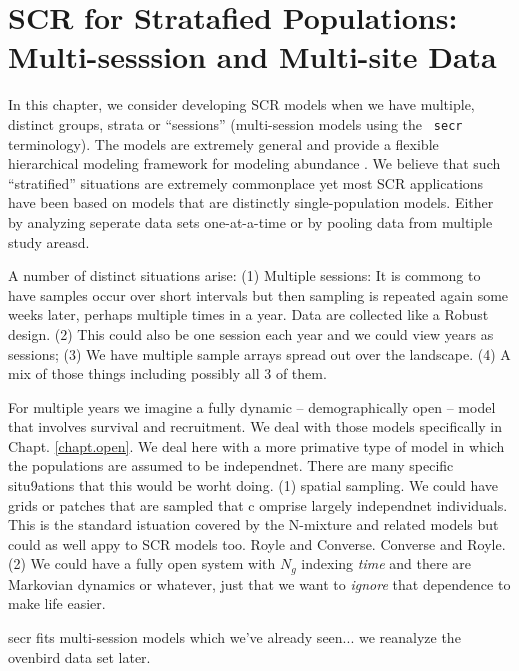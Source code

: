 \chapter{SCR for Stratafied Populations: 
Multi-sesssion and Multi-site Data}
\label{chapt.hscr}

\vspace{0.3cm}


In this chapter, we consider developing SCR models when we have
multiple, distinct groups, strata or ``sessions'' (multi-session
models using the \mbox{\tt
  secr} terminology). The models are extremely general and provide a
flexible hierarchical modeling framework for modeling abundance
\citep{converse_royle:2012, royle_etal:2012arXiv}.
We believe that such ``stratified'' situations are extremely
commonplace yet most SCR applications have been based on models that
are distinctly single-population models. Either by analyzing seperate
data sets one-at-a-time or by pooling data from multiple study areasd.

A number of distinct situations arise:
(1) Multiple sessions:
It is commong to have samples occur over short intervals but then
sampling is repeated again some weeks later, perhaps multiple times in
a year.  Data are collected like a Robust design.
(2) This could also be one session each year and we could view years
as sessions;
(3) We have multiple sample arrays spread out over the landscape.
(4) A mix of those things including possibly all 3 of them.

For multiple years we imagine a fully dynamic -- demographically open
-- model that involves survival and recruitment. We deal with those
models specifically in Chapt. \ref{chapt.open}.
We deal here with a more primative type of model in which the
populations are assumed to be independnet.  There are many specific
situ9ations that this would be worht doing.
(1) spatial sampling. We could have grids or patches that are sampled
that c omprise largely independnet individuals. This is the standard
istuation covered by the N-mixture and related models but could as
well appy to SCR models too. Royle and Converse. Converse and Royle.
(2) We could have a fully open system with $N_{g}$ indexing {\it time}
and there are Markovian dynamics or whatever, just that we want to
{\it ignore} that dependence to make life easier.

secr fits multi-session models which we've already seen... we
reanalyze the ovenbird data set later.


